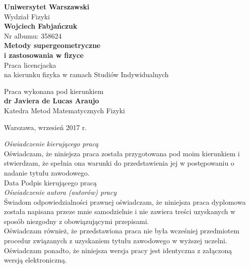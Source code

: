 \documentclass[11pt,a4paper]{report}
\theoremstyle{definition}
\begin{document}
\begin{titlepage}
	\begin{center}
								
								
		\LARGE \textbf{Uniwersytet Warszawski}\\
		\LARGE Wydział Fizyki\\[2cm]
		\LARGE{\textbf{Wojciech Fabjańczuk}}\\
		\LARGE{Nr albumu: 358624}\\[3cm]
		\Huge \textbf{Metody supergeometryczne \\i zastosowania w fizyce}\\[3cm]
		\Large Praca licencjacka\\
		na kierunku fizyka w ramach Studiów Indywidualnych \\[2cm]
								
	\end{center}
	\begin{flushright}
		\Large Praca wykonana pod kierunkiem\\
		\textbf{dr Javiera de Lucas Araujo}\\
		Katedra Metod Matematycznych Fizyki\\[3.5cm]
	\end{flushright}
	\begin{center}
		\Large Warszawa, wrzesień 2017 r.
	\end{center}
\end{titlepage}

\noindent\textit{Oświadczenie kierującego pracą}\\[0.25cm]
\textnormal{Oświadczam, że niniejsza praca została przygotowana pod moim kierunkiem i stwierdzam, że spełnia ona warunki do przedstawienia jej w postępowaniu o nadanie tytułu zawodowego.}\\[1cm]

\noindent \hspace{1cm} \textnormal{Data} \hspace{2cm} \textnormal{Podpis kierującego pracą}
\\[4cm]

\noindent \textit{Oświadczenie autora (autorów) pracy}\\[0.25cm]
\textnormal{Świadom odpowiedzialności prawnej oświadczam, że niniejsza praca dyplomowa została napisana przeze mnie samodzielnie i nie zawiera treści uzyskanych w sposób niezgodny z obowiązującymi przepisami.\\ Oświadczam również, że przedstawiona praca nie była wcześniej przedmiotem procedur związanych z uzyskaniem tytułu zawodowego w wyższej uczelni.\\ Oświadczam ponadto, że niniejsza wersja pracy jest identyczna z załączoną wersją elektroniczną.}\\[1cm]
\end{document}
